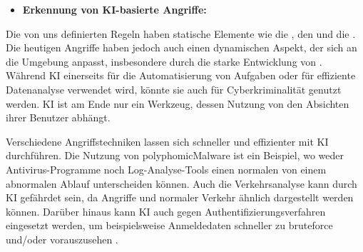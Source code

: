 \begin{itemize}[noitemsep]
    \item \textbf{Erkennung von \gls{KI}-basierte Angriffe:}
\end{itemize}

Die von uns definierten Regeln haben statische Elemente wie die , den  und die . Die heutigen Angriffe haben jedoch auch einen dynamischen Aspekt, der sich an die Umgebung anpasst, insbesondere durch die starke Entwicklung von  \citep{Guembe_AIHACKER}. Während \gls{KI} einerseits für die Automatisierung von Aufgaben oder für effiziente Datenanalyse verwendet wird, könnte sie auch für Cyberkriminalität genutzt werden. \gls{KI} ist am Ende nur ein Werkzeug, dessen Nutzung von den Absichten ihrer Benutzer abhängt.

Verschiedene Angriffstechniken lassen sich schneller und effizienter mit \gls{KI} durchführen. Die Nutzung von \gls{polyphomicMalware} ist ein Beispiel, wo weder Antivirus-Programme noch Log-Analyse-Tools einen normalen von einem abnormalen Ablauf unterscheiden können. Auch die Verkehrsanalyse kann durch \gls{KI} gefährdet sein, da Angriffe und normaler Verkehr ähnlich dargestellt werden können. Darüber hinaus kann \gls{KI} auch gegen Authentifizierungsverfahren eingesetzt werden, um beispielsweise Anmeldedaten schneller zu \gls{bruteforce} und/oder vorauszusehen \citep{Fritsch_AIcybersec}.



 



